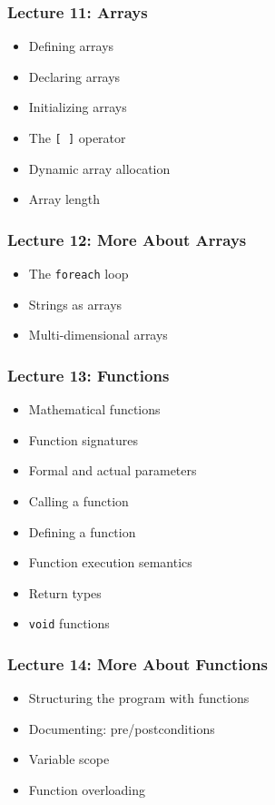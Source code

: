 \begin{frame}
\frametitle{Lecture 11: Arrays}

{\Large
\begin{itemize}
	\item Defining arrays
	\item Declaring arrays
	\item Initializing arrays
	\item The \texttt{[~]} operator
	\item Dynamic array allocation
	\item Array length
	
\end{itemize}
}

\end{frame}


\begin{frame}
\frametitle{Lecture 12: More About Arrays}

{\Large
\begin{itemize}
	\item The \texttt{foreach} loop
	\item Strings as arrays
	\item Multi-dimensional arrays
\end{itemize}
}

\end{frame}


\begin{frame}
\frametitle{Lecture 13: Functions}

{\Large
\begin{itemize}
	\item Mathematical functions
	\item Function signatures
	\item Formal and actual parameters
	\item Calling a function
	\item Defining a function
	\item Function execution semantics
	\item Return types
	\item \texttt{void} functions
	
	
\end{itemize}
}

\end{frame}

\begin{frame}
\frametitle{Lecture 14: More About Functions}

{\Large
\begin{itemize}
	\item Structuring the program with functions	
	\item Documenting: pre/postconditions
	\item Variable scope
	\item Function overloading
\end{itemize}
}

\end{frame}

